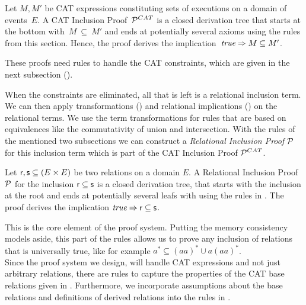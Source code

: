 \documentclass[a4paper,twoside,12pt, english]{article}
\begin{document}
\begin{definition}
Let $M,M'$ be CAT expressions constituting sets of executions on a domain of events~$E$. A CAT Inclusion Proof~$\mathcal{P}^{CAT}$ is a closed derivation tree that starts at the bottom with~$M~\subseteq~ M'$ and ends at potentially several axioms using the rules from this section.
Hence, the proof derives the implication~$\textit{true} \Rightarrow M \subseteq M'$.
\end{definition}

These proofs need rules to handle the CAT constraints, which are given in the next subsection (). 

When the constraints are eliminated, all that is left is a relational inclusion term.  We can then apply transformations () and relational implications () on the relational terms. We use the term transformations for rules that are based on equivalences like the commutativity of union and intersection. With the rules of the mentioned two subsections we can construct a \textit{Relational Inclusion Proof} $\mathcal{P}$ for this inclusion term which is part of the CAT Inclusion Proof $\mathcal{P}^{CAT}$.

\begin{definition}
Let $\textsf{\upshape r},\textsf{\upshape s} \subseteq (E \times E)$ be two relations on a domain $E$. A Relational Inclusion Proof $\mathcal{P}$ for the inclusion $\textsf{\upshape r} \subseteq \textsf{\upshape s}$ is a closed derivation tree, that starts with the inclusion at the root and ends at potentially several leafs with \true{} using the rules in . The proof derives the implication $\textit{true} \Rightarrow \textsf{\upshape r} \subseteq \textsf{\upshape s}$. 
\end{definition}
This is the core element of the proof system. Putting the memory consistency models aside, this part of the rules allows us to prove any inclusion of relations that is universally true, like for example $a^* \subseteq (aa)^* \cup a(aa)^*$. \\
Since the proof system we design, will handle CAT expressions and not just arbitrary relations, there are rules to capture the properties of the CAT base relations given in . Furthermore, we incorporate assumptions about the base relations and definitions of derived relations into the rules in .
\end{document}
